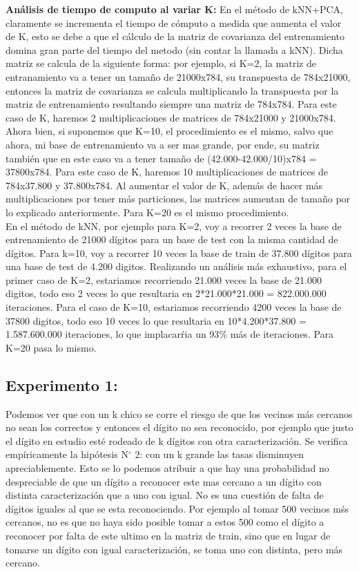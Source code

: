 \textbf{Análisis de tiempo de computo al variar K:}
 En el método de kNN+PCA, claramente se incrementa el tiempo de cómputo a medida que aumenta el valor de K, esto se debe a que el cálculo de la matriz de covarianza del entrenamiento domina gran parte del tiempo del metodo (sin contar la llamada a kNN). Dicha matriz se calcula de la siguiente forma: por ejemplo, si K=2, la matriz de entranamiento va a tener un tamaño de 21000x784, su transpuesta de 784x21000, entonces la matriz de covarianza se calcula multiplicando la transpuesta por la matriz de entrenamiento resultando siempre una matriz de 784x784. Para este caso de K, haremos 2 multiplicaciones de matrices de 784x21000 y 21000x784. Ahora bien, si suponemos que K=10, el procedimiento es el mismo, salvo que ahora, mi base de entrenamiento va a ser mas grande, por ende, su matriz también que en este caso va a tener tamaño de (42.000-42.000/10)x784 = 37800x784. Para este caso de K, haremos 10 multiplicaciones de matrices de 784x37.800 y 37.800x784. Al aumentar el valor de K, además de hacer más multiplicaciones por tener más particiones, las matrices aumentan de tamaño por lo explicado anteriormente. Para K=20 es el mismo procedimiento.\\
En el método de kNN, por ejemplo para K=2, voy a recorrer 2 veces la base de entrenamiento de 21000 dígitos para un base de test con la misma cantidad de dígitos. Para k=10, voy a recorrer 10 veces la base de train de 37.800 dígitos para una base de test de 4.200 digitos. Realizando un análisis más exhaustivo, para el primer caso de K=2, estariamos recorriendo 21.000 veces la base de 21.000 digitos, todo eso 2 veces lo que resultaria en 2*21.000*21.000 = 822.000.000 iteraciones. Para el caso de K=10, estariamos recorriendo 4200 veces la base de 37800 digitos, todo eso 10 veces lo que resultaria en 10*4.200*37.800 = 1.587.600.000 iteraciones, lo que implacarŕia un 93$\%$ más de iteraciones. Para K=20 pasa lo mismo.\\

 \subsection{Experimento 1:}

Podemos ver que con un k chico se corre el riesgo de que los vecinos más cercanos no sean los correctos y entonces el dígito no sea reconocido, por ejemplo que justo el dígito en estudio esté rodeado de k dígitos con otra caracterización. Se verifica empíricamente la hipótesis N$ ^{\circ} $ 2: con un k grande las tasas disminuyen apreciablemente. Esto se lo podemos atribuir a que hay una probabilidad no despreciable de que un dígito a reconocer este mas cercano a un dígito con distinta caracterización que a uno con igual. No es una cuestión de falta de dígitos iguales al que se esta reconociendo. Por ejemplo al tomar 500 vecinos mśs cercanos, no es que no haya sido posible tomar a estos 500 como el dígito a reconocer por falta de este ultimo en la matriz de train, sino que en lugar de tomarse un dígito con igual caracterización, se toma uno con distinta, pero más cercano.

